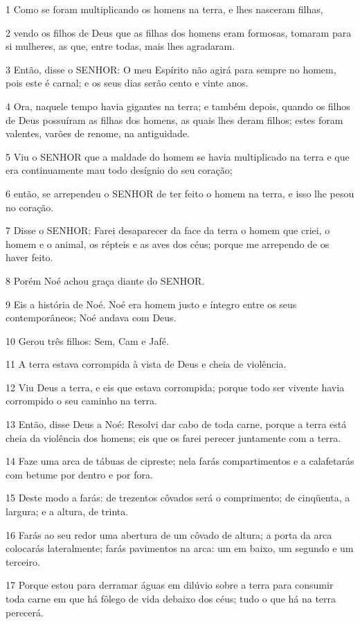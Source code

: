 \par 1 Como se foram multiplicando os homens na terra, e lhes nasceram filhas,
\par 2 vendo os filhos de Deus que as filhas dos homens eram formosas, tomaram para si mulheres, as que, entre todas, mais lhes agradaram.
\par 3 Então, disse o SENHOR: O meu Espírito não agirá para sempre no homem, pois este é carnal; e os seus dias serão cento e vinte anos.
\par 4 Ora, naquele tempo havia gigantes na terra; e também depois, quando os filhos de Deus possuíram as filhas dos homens, as quais lhes deram filhos; estes foram valentes, varões de renome, na antiguidade.
\par 5 Viu o SENHOR que a maldade do homem se havia multiplicado na terra e que era continuamente mau todo desígnio do seu coração;
\par 6 então, se arrependeu o SENHOR de ter feito o homem na terra, e isso lhe pesou no coração.
\par 7 Disse o SENHOR: Farei desaparecer da face da terra o homem que criei, o homem e o animal, os répteis e as aves dos céus; porque me arrependo de os haver feito.
\par 8 Porém Noé achou graça diante do SENHOR.
\par 9 Eis a história de Noé. Noé era homem justo e íntegro entre os seus contemporâneos; Noé andava com Deus.
\par 10 Gerou três filhos: Sem, Cam e Jafé.
\par 11 A terra estava corrompida à vista de Deus e cheia de violência.
\par 12 Viu Deus a terra, e eis que estava corrompida; porque todo ser vivente havia corrompido o seu caminho na terra.
\par 13 Então, disse Deus a Noé: Resolvi dar cabo de toda carne, porque a terra está cheia da violência dos homens; eis que os farei perecer juntamente com a terra.
\par 14 Faze uma arca de tábuas de cipreste; nela farás compartimentos e a calafetarás com betume por dentro e por fora.
\par 15 Deste modo a farás: de trezentos côvados será o comprimento; de cinqüenta, a largura; e a altura, de trinta.
\par 16 Farás ao seu redor uma abertura de um côvado de altura; a porta da arca colocarás lateralmente; farás pavimentos na arca: um em baixo, um segundo e um terceiro.
\par 17 Porque estou para derramar águas em dilúvio sobre a terra para consumir toda carne em que há fôlego de vida debaixo dos céus; tudo o que há na terra perecerá.
